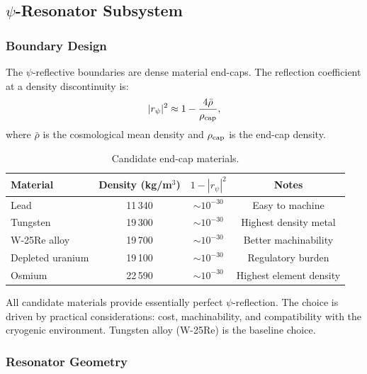 \documentclass[11pt,a4paper]{article}
\begin{document}
\subsection{$\psi$-Resonator Subsystem}

\subsubsection{Boundary Design}

The $\psi$-reflective boundaries are dense material end-caps.  The
reflection coefficient at a density discontinuity is:
\begin{equation}
|r_\psi|^2 \approx 1 - \frac{4\bar{\rho}}{\rho_{\rm cap}},
\end{equation}
where $\bar{\rho}$ is the cosmological mean density and $\rho_{\rm cap}$
is the end-cap density.

\begin{table}[h]
\centering
\caption{Candidate end-cap materials.}
\label{tab:endcap}
\begin{tabular}{@{}lccc@{}}
\toprule
Material & Density (kg/m$^3$) & $1 - |r_\psi|^2$ & Notes \\
\midrule
Lead & 11\,340 & $\sim 10^{-30}$ & Easy to machine \\
Tungsten & 19\,300 & $\sim 10^{-30}$ & Highest density metal \\
W-25Re alloy & 19\,700 & $\sim 10^{-30}$ & Better machinability \\
Depleted uranium & 19\,100 & $\sim 10^{-30}$ & Regulatory burden \\
Osmium & 22\,590 & $\sim 10^{-30}$ & Highest element density \\
\bottomrule
\end{tabular}
\end{table}

All candidate materials provide essentially perfect $\psi$-reflection.
The choice is driven by practical considerations: cost, machinability,
and compatibility with the cryogenic environment.  Tungsten alloy
(W-25Re) is the baseline choice.

\subsubsection{Resonator Geometry}
\end{document}
